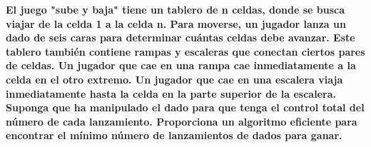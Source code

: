 \textbf{
    El juego "sube y baja" tiene un tablero de n celdas, donde
    se busca viajar de la celda 1 a la celda n. Para moverse, un
    jugador lanza un dado de seis caras para determinar cuántas celdas 
    debe avanzar. Este tablero también contiene rampas y escaleras que
    conectan ciertos pares de celdas. Un jugador que cae en una rampa 
    cae inmediatamente a la celda en el otro extremo. Un jugador que 
    cae en una escalera viaja inmediatamente hasta la celda en la parte 
    superior de la escalera. Suponga que ha manipulado el dado para que 
    tenga el control total del número de cada lanzamiento. Proporciona un
    algoritmo eficiente para encontrar el mínimo número de lanzamientos de
    dados para ganar.
}\vspace{.2cm}
\textcolor{bibi}{}
\begin{quote}
\end{quote}